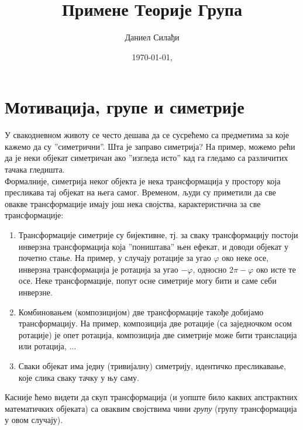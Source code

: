 \documentclass{report}
\theoremstyle{plain}
\theoremstyle{definition}
\begin{document}
\title{Примене Теорије Група}

\author{Даниел Силађи}
\date{\today, \currenttime}

\maketitle

\tableofcontents

\chapter{Мотивација, групе и симетрије}
У свакодневном животу се често дешава да се сусрећемо са предметима за које
кажемо да су ''симетрични''. Шта је заправо симетрија? На пример, можемо рећи да је
неки објекат симетричан ако ''изгледа исто'' кад га гледамо са различитих тачака гледишта.\\
Формалније, симетрија неког објекта је нека трансформација у простору која пресликава
тај објекат на њега самог. Временом, људи су приметили да све овакве трансформације
имају још нека својства, карактеристична за све трансформације:
\begin{enumerate}
  \item Трансформације симетрије су бијективне, тј. за сваку трансформацију постоји инверзна трансформација која ''поништава'' њен ефекат, и доводи објекат у почетно стање. На пример, у случају ротације за угао $\varphi$ око неке осе, инверзна трансформација је ротација за угао $-\varphi$, односно $2\pi-\varphi$ око исте те осе. Неке трансформације, попут осне симетрије могу бити и саме себи инверзне.
  \item Комбиновањем (композицијом) две трансформације такође добијамо трансформацију. На пример, композиција две ротације (са заједночком осом ротације) је опет ротација, композиција две симетрије може бити транслација или ротација, ...
  \item Сваки објекат има једну (тривијалну) симетрију, идентичко пресликавање, које слика сваку тачку у њу саму.
\end{enumerate}
Касније ћемо видети да скуп трансформација (и уопште било каквих апстрактних математичких објеката) са оваквим својствима чини \emph{групу} (групу трансформација у овом случају).
\end{document}
